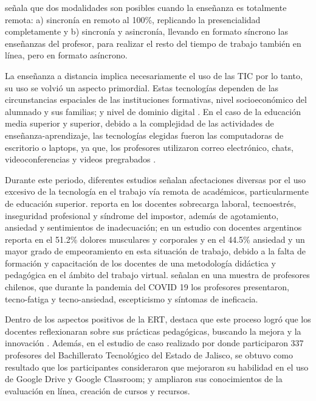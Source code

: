 \documentclass[spanish]{textolivre}
\begin{document}
\textcite{garcia_aretio_covid-19_2021} señala que dos modalidades son posibles cuando la enseñanza es totalmente remota: a) sincronía en remoto al 100\%, replicando la presencialidad completamente y b) sincronía y asincronía, llevando en formato síncrono las enseñanzas del profesor, para realizar el resto del tiempo de trabajo también en línea, pero en formato asíncrono. 

La enseñanza a distancia implica necesariamente el uso de las TIC por lo tanto, su uso se volvió un aspecto primordial. Estas tecnologías dependen de las circunstancias espaciales de las instituciones formativas, nivel socioeconómico del alumnado y sus familias; y nivel de dominio digital \cite{gomez-arteta_educacion_2021}. En el caso de la educación media superior y superior, debido a la complejidad de las actividades de enseñanza-aprendizaje, las tecnologías elegidas fueron las computadoras de escritorio o laptops, ya que, los profesores utilizaron correo electrónico, chats, videoconferencias y videos pregrabados \cite{hidalgo_cajo_adopcion_2021}.

Durante este periodo, diferentes estudios señalan afectaciones diversas por el uso excesivo de la tecnología en el trabajo vía remota de académicos, particularmente de educación superior. \textcite{murgu_modern_2021} reporta en los docentes sobrecarga laboral, tecnoestrés, inseguridad profesional y síndrome del impostor, además de agotamiento, ansiedad y sentimientos de inadecuación; \textcite{casali_impacto_nodate} en un estudio con docentes argentinos reporta en el 51.2\% dolores musculares y corporales y en el 44.5\% ansiedad y un mayor grado de empeoramiento en esta situación de trabajo, debido a la falta de formación y capacitación de los docentes de una metodología didáctica y pedagógica en el ámbito del trabajo virtual. \textcite{estrada-munoz_technostress_nodate} señalan en una muestra de profesores chilenos, que durante la pandemia del COVID 19 los profesores presentaron, tecno-fatiga y tecno-ansiedad, escepticismo y síntomas de ineficacia.

Dentro de los aspectos positivos de la ERT, destaca que este proceso logró que los docentes reflexionaran sobre sus prácticas pedagógicas, buscando la mejora y la innovación \cite{rodriguez2021ensenanza}. Además, en el estudio de caso realizado por \textcite{gonzalez_fernandez_capacitacion_2021} donde participaron 337 profesores del Bachillerato Tecnológico del Estado de Jalisco, se obtuvo como resultado que los participantes consideraron que mejoraron su habilidad en el uso de Google Drive y Google Classroom; y ampliaron sus conocimientos de la evaluación en línea, creación de cursos y recursos.
\end{document}
